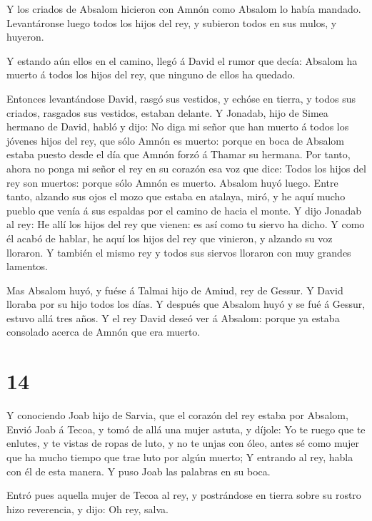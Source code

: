  Y los criados de Absalom hicieron con Amnón como Absalom
lo había mandado. Levantáronse luego todos los hijos del rey, y subieron
todos en sus mulos, y huyeron.

 Y estando aún ellos en el camino, llegó á David el rumor
que decía: Absalom ha muerto á todos los hijos del rey, que ninguno de
ellos ha quedado.

 Entonces levantándose David, rasgó sus vestidos, y echóse
en tierra, y todos sus criados, rasgados sus vestidos, estaban delante.
 Y Jonadab, hijo de Simea hermano de David, habló y dijo:
No diga mi señor que han muerto á todos los jóvenes hijos del rey, que
sólo Amnón es muerto: porque en boca de Absalom estaba puesto desde el
día que Amnón forzó á Thamar su hermana.  Por tanto, ahora
no ponga mi señor el rey en su corazón esa voz que dice: Todos los hijos
del rey son muertos: porque sólo Amnón es muerto.  Absalom
huyó luego. Entre tanto, alzando sus ojos el mozo que estaba en atalaya,
miró, y he aquí mucho pueblo que venía á sus espaldas por el camino de
hacia el monte.  Y dijo Jonadab al rey: He allí los hijos
del rey que vienen: es así como tu siervo ha dicho.  Y como
él acabó de hablar, he aquí los hijos del rey que vinieron, y alzando su
voz lloraron. Y también el mismo rey y todos sus siervos lloraron con
muy grandes lamentos.

 Mas Absalom huyó, y fuése á Talmai hijo de Amiud, rey de
Gessur. Y David lloraba por su hijo todos los días.  Y
después que Absalom huyó y se fué á Gessur, estuvo allá tres años.
 Y el rey David deseó ver á Absalom: porque ya estaba
consolado acerca de Amnón que era muerto.

\hypertarget{section-13}{%
\section{14}\label{section-13}}

 Y conociendo Joab hijo de Sarvia, que el corazón del rey
estaba por Absalom,  Envió Joab á Tecoa, y tomó de allá una
mujer astuta, y díjole: Yo te ruego que te enlutes, y te vistas de ropas
de luto, y no te unjas con óleo, antes sé como mujer que ha mucho tiempo
que trae luto por algún muerto;  Y entrando al rey, habla
con él de esta manera. Y puso Joab las palabras en su boca.

 Entró pues aquella mujer de Tecoa al rey, y postrándose en
tierra sobre su rostro hizo reverencia, y dijo: Oh rey, salva.

